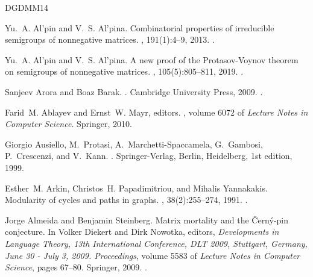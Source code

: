\documentclass[11pt,a4paper]{amsart}
\theoremstyle{plain}
\theoremstyle{definition}
\theoremstyle{defC}
\theoremstyle{thmC}
\theoremstyle{plain}
\numberwithin{equation}{section}
\begin{document}
\newcommand{\etalchar}[1]{$^{#1}$}
\begin{thebibliography}{DGDMM14}

Yu.~A. Al’pin and V.~S. Al’pina.
\newblock Combinatorial properties of irreducible semigroups of nonnegative
  matrices.
, 191(1):4--9, 2013.
\newblock \href {https://doi.org/10.1007/s10958-013-1295-8}
  {}.

Yu.~A. Al’pin and V.~S. Al’pina.
\newblock A new proof of the {Protasov-Voynov} theorem on semigroups of
  nonnegative matrices.
, 105(5):805--811, 2019.
\newblock \href {https://doi.org/10.1134/S0001434619050183}
  {}.

Sanjeev Arora and Boaz Barak.
.
\newblock Cambridge University Press, 2009.
\newblock \href {https://doi.org/10.1017/CBO9780511804090}
  {}.

Farid~M. Ablayev and Ernst~W. Mayr, editors.
, volume 6072 of {\em Lecture Notes in Computer Science}.
  Springer, 2010.

\bibitem[APMS{\etalchar{+}}99]{DBLP:books/lib/Ausiello99}
Giorgio Ausiello, M.~Protasi, A.~Marchetti-Spaccamela, G.~Gambosi,
  P.~Crescenzi, and V.~Kann.
.
\newblock Springer-Verlag, Berlin, Heidelberg, 1st edition, 1999.

Esther~M. Arkin, Christos~H. Papadimitriou, and Mihalis Yannakakis.
\newblock Modularity of cycles and paths in graphs.
, 38(2):255--274, 1991.
\newblock \href {https://doi.org/10.1145/103516.103517}
  {}.

Jorge Almeida and Benjamin Steinberg.
\newblock Matrix mortality and the \v{C}ern{\'{y}}-pin conjecture.
\newblock In Volker Diekert and Dirk Nowotka, editors, {\em Developments in
  Language Theory, 13th International Conference, {DLT} 2009, Stuttgart,
  Germany, June 30 - July 3, 2009. Proceedings}, volume 5583 of {\em Lecture
  Notes in Computer Science}, pages 67--80. Springer, 2009.
\newblock \href {https://doi.org/10.1007/978-3-642-02737-6\_5}
  {}.


\end{thebibliography}
\end{document}
